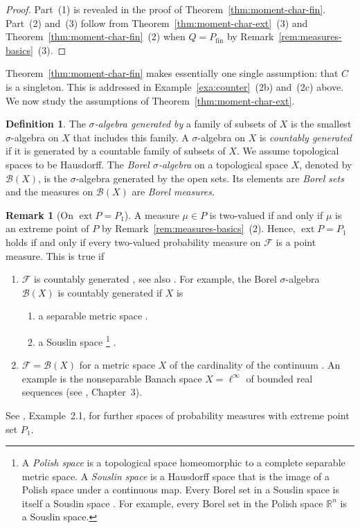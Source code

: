 \documentclass[a4paper,11pt,reqno]{amsart}
\numberwithin{equation}{section}
\theoremstyle{plain}
\theoremstyle{definition}
\newtheorem{definition}[theorem]{Definition}
\newtheorem{remark}[theorem]{Remark}
\newcommand{\cB}{\mathcal{B}} %
\newcommand{\cF}{\mathcal{F}} %
\newcommand{\R}{\mathbb{R}} %
\DeclareMathOperator{\ext}{ext} %
\newcommand\fint{\mathrm{fin}}
\begin{document}
%
\begin{proof}
Part~(1) is revealed in the proof of Theorem~\ref{thm:moment-char-fin}. 
Part~(2) and~(3) follow from Theorem~\ref{thm:moment-char-ext}~(3) and 
Theorem~\ref{thm:moment-char-fin}~(2) when $Q=P_\fint$ by 
Remark~\ref{rem:measures-basics}~(3).
\end{proof}
%
Theorem~\ref{thm:moment-char-fin} makes essentially one single assumption: that $C$ 
is a singleton. This is addressed in Example~\ref{exa:counter}~(2b) and~(2c) above. 
We now study the assumptions of Theorem~\ref{thm:moment-char-ext}.
\par
%
\begin{definition}\label{def:Borel}
The \emph{$\sigma$-algebra generated by} a family of subsets of $X$ is the smallest 
$\sigma$-algebra on $X$ that includes this family. A $\sigma$-algebra on $X$ is 
\emph{countably generated} if it is generated by a countable family of subsets of 
$X$. We assume topological spaces to be Hausdorff. The \emph{Borel $\sigma$-algebra} 
on a topological space $X$, denoted by $\cB(X)$, is the $\sigma$-algebra generated 
by the open sets. Its elements are \emph{Borel sets} and the measures on $\cB(X)$ 
are \emph{Borel measures}.
\end{definition}
%
\begin{remark}[On $\ext P=P_1$]\label{rem:two-valued}
A measure $\mu\in P$ is two-valued if and only if $\mu$ is an extreme point of $P$ by
Remark~\ref{rem:measures-basics}~(2). Hence, $\ext P=P_1$ holds if and only if every 
two-valued probability measure on $\cF$ is a point measure. This is true if
\begin{enumerate}
\item
$\cF$ is countably generated \cite[p.~14]{bhaskara-rao-rao81}, see also 
\cite[Section~6.10]{schilling-kuehn21}. For example, the Borel $\sigma$-algebra $\cB(X)$ 
is countably generated if $X$ is
\begin{enumerate}
\item
a separable metric space \cite[Theorem~11 in Chapter~4]{kelley75}.
\item
a Souslin space%
%
\footnote{A \emph{Polish space} is a topological space homeomorphic to 
a complete separable metric space. A \emph{Souslin space} is a Hausdorff 
space that is the image of a Polish space under a continuous map. Every 
Borel set in a Souslin space is itself a Souslin space 
\cite[p.~96]{schwartz73}. For example, every Borel set in the 
Polish space $\R^n$ is a Souslin space.}
%
\cite[p.~108]{schwartz73}. 
\end{enumerate}
%
\item
$\cF=\cB(X)$ for a metric space $X$ of the cardinality of the continuum 
\cite{marczewski-sikorski48}. An example is the nonseparable Banach space 
$X=\ell^\infty$ of bounded real sequences (see \cite{jech03}, Chapter~3).
\end{enumerate}
See \cite{winkler88}, Example~2.1, for further spaces of probability measures 
with extreme point set $P_1$.
\end{remark}
\end{document}
